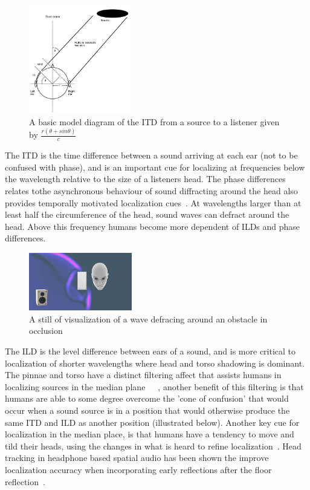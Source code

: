 \documentclass[paper=a4, fontsize=10pt, font=arial]{scrartcl} %
\numberwithin{equation}{section} %
\numberwithin{figure}{section} %
\numberwithin{table}{section} %
\begin{document}
\begin{figure}[H]
\centering
\includegraphics[width=0.4\textwidth]{itdexample.jpg}
\centering
\caption{A basic model diagram of the ITD from a source to a listener given by $\frac{r(\theta + sin \theta)}{\textit{c}}$ ~\cite{rumsey2012spatial}}
\end{figure} 

The ITD is the time difference between a sound arriving at each ear (not to be confused with phase), and is an important cue for localizing at frequencies below the wavelength relative to the size of a listeners head. The phase differences relates tothe asynchronous behaviour of sound diffracting around the head also provides temporally motivated localization cues~\cite{Aaronson2014}. At wavelengths larger than at least half the circumference of the head, sound waves can defract around the head. Above this frequency humans become more dependent of ILDs and phase differences. 

\begin{figure}[H]
\centering
\includegraphics[width=0.4\textwidth]{defractionexample.JPG}
\centering
\caption{A still of visualization of a wave defracing around an obstacle in occlusion ~\cite{googlevr2016}}
\end{figure} 

The ILD is the level difference between ears of a sound, and is more critical to localization of shorter wavelengths where head and torso shadowing is dominant. The pinnae and torso have a distinct filtering affect that assists humans in localizing sources in the median plane~\cite{Blauert1997}~\cite{Begault1995}~\cite{Wiggins2004}, another benefit of this filtering is that humans are able to some degree overcome the 'cone of confusion' that would occur when a sound source is in a position that would otherwise produce the same ITD and ILD as another position (illustrated below). Another key cue for localization in the median place, is that humans have a tendency to move and tild their heads, using the changes in what is heard to refine localization~\cite{Blauert1997}. Head tracking in headphone based spatial audio has been shown the improve localization accuracy when incorporating early reflections after the floor reflection~\cite{Angel2002}.
\end{document}
